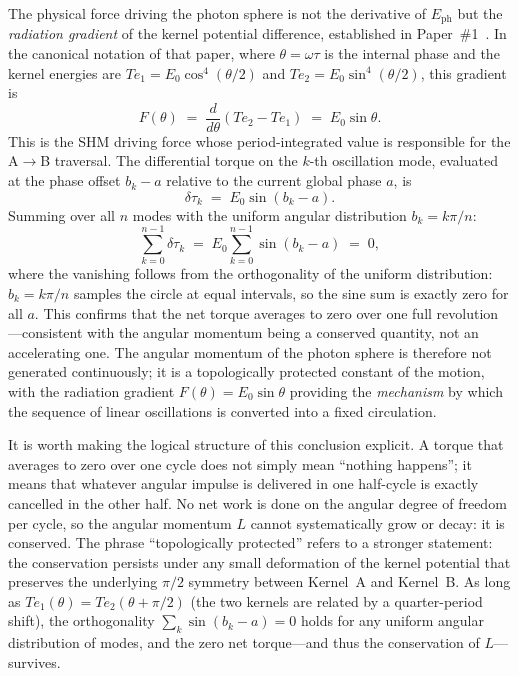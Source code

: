 \documentclass[%
 reprint, amsmath,amssymb, aps, prb, ]{revtex4-2}
\numberwithin{equation}{section}
\begin{document}
The physical force driving the photon sphere is not the derivative of $E_{\text{ph}}$ but the \emph{radiation gradient} of the kernel potential difference, established in Paper~\#1~\cite{hanamura01}.
In the canonical notation of that paper, where $\theta = \omega\tau$ is the internal phase and the kernel energies are $Te_1 = E_0\cos^4(\theta/2)$ and $Te_2 = E_0\sin^4(\theta/2)$, this gradient is
\begin{equation}
F(\theta) \;=\; \frac{d}{d\theta}(Te_2 - Te_1) \;=\; E_0\sin\theta.
\label{eq:radiation_gradient_50}
\end{equation}
This is the SHM driving force whose period-integrated value is responsible for the A$\to$B traversal.
The differential torque on the $k$-th oscillation mode, evaluated at the phase offset $b_k - a$ relative to the current global phase $a$, is
\begin{equation}
\delta\tau_k \;=\; E_0\sin(b_k - a).
\label{eq:mode_torque}
\end{equation}
Summing over all $n$ modes with the uniform angular distribution $b_k = k\pi/n$:
\begin{equation}
\sum_{k=0}^{n-1}\delta\tau_k \;=\; E_0\sum_{k=0}^{n-1}\sin(b_k - a) \;=\; 0,
\label{eq:zero_torque}
\end{equation}
where the vanishing follows from the orthogonality of the uniform distribution: $b_k = k\pi/n$ samples the circle at equal intervals, so the sine sum is exactly zero for all $a$.
This confirms that the net torque averages to zero over one full revolution---consistent with the angular momentum being a conserved quantity, not an accelerating one.
The angular momentum of the photon sphere is therefore not generated continuously; it is a topologically protected constant of the motion, with the radiation gradient $F(\theta) = E_0\sin\theta$ providing the \emph{mechanism} by which the sequence of linear oscillations is converted into a fixed circulation.

It is worth making the logical structure of this conclusion explicit.
A torque that averages to zero over one cycle does not simply mean ``nothing happens''; it means that whatever angular impulse is delivered in one half-cycle is exactly cancelled in the other half.
No net work is done on the angular degree of freedom per cycle, so the angular momentum $L$ cannot systematically grow or decay: it is conserved.
The phrase ``topologically protected'' refers to a stronger statement: the conservation persists under any small deformation of the kernel potential that preserves the underlying $\pi/2$ symmetry between Kernel~A and Kernel~B.
As long as $Te_1(\theta) = Te_2(\theta + \pi/2)$ (the two kernels are related by a quarter-period shift), the orthogonality $\sum_k\sin(b_k - a) = 0$ holds for any uniform angular distribution of modes, and the zero net torque---and thus the conservation of $L$---survives.
\end{document}
